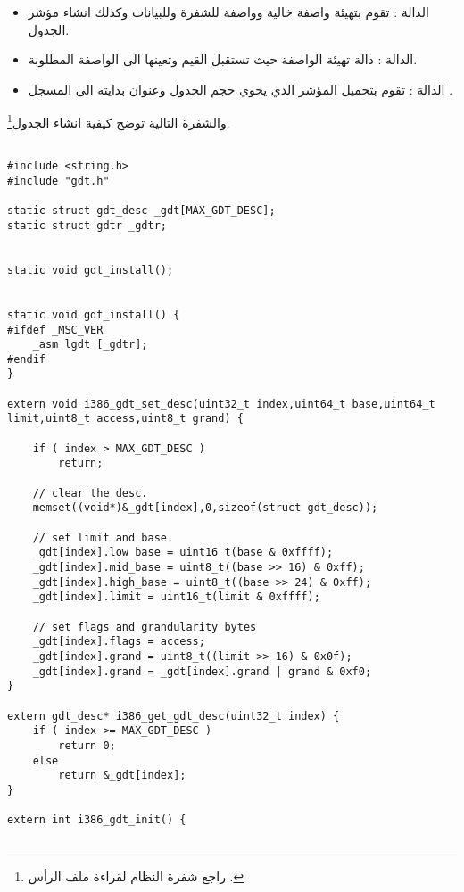 \documentclass[document.tex]{subfiles}
\begin{document}
\begin{itemize}
\item الدالة : تقوم بتهيئة واصفة خالية وواصفة للشفرة وللبيانات وكذلك انشاء مؤشر الجدول.
\item الدالة : دالة تهيئة الواصفة حيث تستقبل القيم وتعينها الى الواصفة المطلوبة.
\item الدالة : تقوم بتحميل المؤشر الذي يحوي حجم الجدول وعنوان بدايته الى المسجل .  
\end{itemize}
والشفرة التالية توضح كيفية انشاء الجدول\footnote{راجع شفرة النظام لقراءة ملف الرأس .}.
\begin{english}

\lstset{numberstyle=\tiny,numbersep=5pt,tabsize=2,extendedchars=true,breaklines=true,frame=b,showspaces=false, showtabs=false,xleftmargin=10pt,framexleftmargin=10pt,framexrightmargin=5pt,framexbottommargin=4pt,showstringspaces=false,language=C++}

\begin{lstlisting}[label=gdt_c,caption=hal/gdt.cpp:Install GDT]

#include <string.h>
#include "gdt.h"
 
static struct gdt_desc _gdt[MAX_GDT_DESC];
static struct gdtr _gdtr;


static void gdt_install();


static void gdt_install() {
#ifdef _MSC_VER
	_asm lgdt [_gdtr];
#endif
}

extern void i386_gdt_set_desc(uint32_t index,uint64_t base,uint64_t limit,uint8_t access,uint8_t grand) {
	
	if ( index > MAX_GDT_DESC )
		return;
		
	// clear the desc.
	memset((void*)&_gdt[index],0,sizeof(struct gdt_desc));
	
	// set limit and base.
	_gdt[index].low_base = uint16_t(base & 0xffff);
	_gdt[index].mid_base = uint8_t((base >> 16) & 0xff);
	_gdt[index].high_base = uint8_t((base >> 24) & 0xff);
	_gdt[index].limit = uint16_t(limit & 0xffff);
	
	// set flags and grandularity bytes
	_gdt[index].flags = access;
	_gdt[index].grand = uint8_t((limit >> 16) & 0x0f);
	_gdt[index].grand = _gdt[index].grand | grand & 0xf0;
}

extern gdt_desc* i386_get_gdt_desc(uint32_t index) {
	if ( index >= MAX_GDT_DESC )
		return 0;
	else
		return &_gdt[index];
}

extern int i386_gdt_init() {
	

\end{lstlisting}
\end{english}
\end{document}

